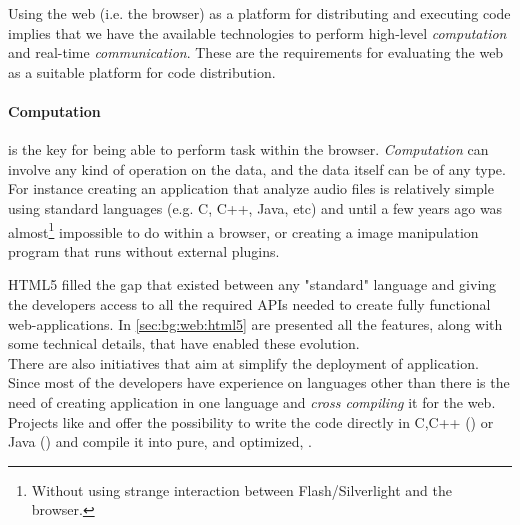 


Using the web (i.e. the browser) as a platform for distributing and executing
code implies that we have the available technologies to perform high-level
\emph{computation} and real-time \emph{communication}. These are the requirements
for evaluating the web as a suitable platform for code distribution.\\

\paragraph{Computation} is the key for being able to perform task within the
browser. \emph{Computation} can involve any kind of operation on the data, and
the data itself can be of any type. For instance creating an application that
analyze audio files is relatively simple using standard languages (e.g. C, C++,
Java, etc) and until a few years ago was almost\footnote{Without using strange
interaction between Flash/Silverlight and the browser.} impossible to do within
a browser, or creating a image manipulation program that runs without external
plugins.

HTML5 filled the gap that existed between any "standard" language and \js{}
giving the developers access to all the required APIs needed to create fully
functional web-applications. In \ref{sec:bg:web:html5} are presented all the
features, along with some technical details, that have enabled these evolution.\\

There are also initiatives that aim at simplify the deployment of \js{}
application. Since most of the developers have experience on languages other than
\js{} there is the need of creating application in one language and \emph{cross
compiling} it for the web. Projects like  and 
offer the possibility to write the code directly in C,C++ ()
or Java () and compile it into pure, and optimized, \js{}.

